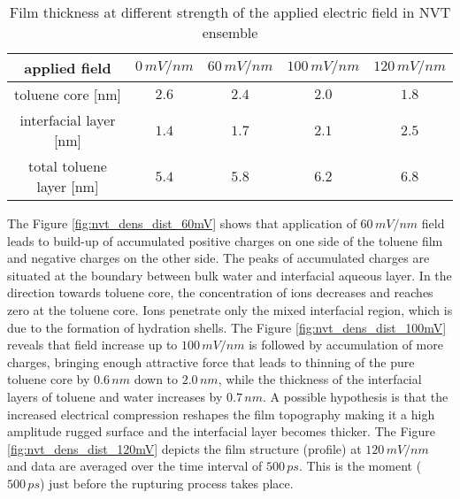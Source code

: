 \begin{center}
\begin{table}[ht]
\centering
\begin{tabular}{|c|c|c|c|c|}
\hline
applied field           &$0\, mV/nm$   &$60\, mV/nm$   &$100\, mV/nm$   &$120\, mV/nm$ \\ \hline
toluene core [nm]       &$2.6$         &$2.4$          &$2.0$           &$1.8$   \\ \hline
interfacial layer [nm]  &$1.4$         &$1.7$          &$2.1$           &$2.5$    \\ \hline
total toluene layer [nm]  &$5.4$         &$5.8$          &$6.2$           &$6.8$    \\ \hline
\end{tabular}
\caption{Film thickness at different strength of the applied electric field in NVT ensemble }
\label{table:nvt_film_thickness}
\end{table}
\end{center}


The Figure \ref{fig:nvt_dens_dist_60mV} shows that application of $60\, mV/nm$ field leads to build-up of accumulated positive charges on one side of the toluene film and negative charges on the other side. The peaks of accumulated charges are  situated at the boundary between bulk water and interfacial aqueous layer. In the direction towards toluene core, the concentration of ions decreases  and reaches zero at the toluene core. Ions penetrate only the mixed interfacial region, which is due to the formation of hydration shells. The Figure \ref{fig:nvt_dens_dist_100mV} reveals that field increase up to $100\, mV/nm$ is followed by accumulation of more charges, bringing enough attractive force that leads to thinning of the pure toluene core by $0.6\, nm$ down to $2.0\, nm$, while the thickness of the interfacial layers of toluene and water increases by $0.7\, nm$. 
A possible hypothesis is that the increased electrical compression reshapes the film topography making it a high amplitude rugged surface and the interfacial layer becomes thicker.
The Figure \ref{fig:nvt_dens_dist_120mV} depicts the film structure (profile) at $120\, mV/nm$ and data are averaged over the time interval of $500\, ps$. This  is the moment ($500\, ps$) just before the rupturing process takes place. 


